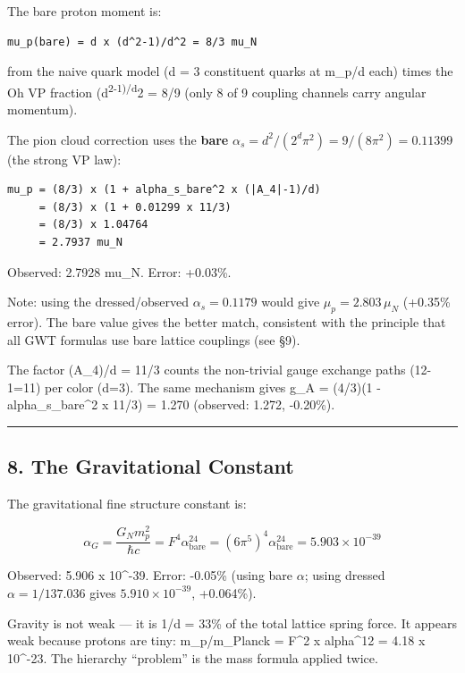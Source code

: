 \documentclass[
]{article}
\begin{document}
The bare proton moment is:

\begin{verbatim}
mu_p(bare) = d x (d^2-1)/d^2 = 8/3 mu_N
\end{verbatim}

from the naive quark model (d = 3 constituent quarks at m\_p/d each)
times the Oh VP fraction (d\textsuperscript{2-1)/d}2 = 8/9 (only 8 of 9
coupling channels carry angular momentum).

The pion cloud correction uses the \textbf{bare}
\(\alpha_s = d^2/(2^d \pi^2) = 9/(8\pi^2) = 0.11399\) (the strong VP
law):

\begin{verbatim}
mu_p = (8/3) x (1 + alpha_s_bare^2 x (|A_4|-1)/d)
     = (8/3) x (1 + 0.01299 x 11/3)
     = (8/3) x 1.04764
     = 2.7937 mu_N
\end{verbatim}

Observed: 2.7928 mu\_N. Error: +0.03\%.

Note: using the dressed/observed \(\alpha_s = 0.1179\) would give
\(\mu_p = 2.803\,\mu_N\) (+0.35\% error). The bare value gives the
better match, consistent with the principle that all GWT formulas use
bare lattice couplings (see §9).

The factor (\textbar A\_4)/d = 11/3 counts the non-trivial
gauge exchange paths (12-1=11) per color (d=3). The same mechanism gives
g\_A = (4/3)(1 - alpha\_s\_bare\^{}2 x 11/3) = 1.270 (observed: 1.272,
-0.20\%).

\begin{center}\rule{0.5\linewidth}{0.5pt}\end{center}

\subsection{8. The Gravitational
Constant}\label{the-gravitational-constant}

The gravitational fine structure constant is:

\[\alpha_G = \frac{G_N m_p^2}{\hbar c} = F^4 \alpha_{\text{bare}}^{24} = (6\pi^5)^4 \alpha_{\text{bare}}^{24} = 5.903 \times 10^{-39}\]

Observed: 5.906 x 10\^{}-39. Error: -0.05\% (using bare \(\alpha\);
using dressed \(\alpha = 1/137.036\) gives \(5.910 \times 10^{-39}\),
+0.064\%).

Gravity is not weak --- it is 1/d = 33\% of the total lattice spring
force. It appears weak because protons are tiny: m\_p/m\_Planck = F\^{}2
x alpha\^{}12 = 4.18 x 10\^{}-23. The hierarchy ``problem'' is the mass
formula applied twice.
\end{document}
